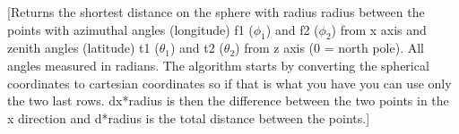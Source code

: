 [Returns the shortest distance on the sphere with radius radius between the points
 with azimuthal angles (longitude) f1 ($\phi_1$) and f2 ($\phi_2$) from x axis and zenith angles
 (latitude) t1 ($\theta_1$) and t2 ($\theta_2$) from z axis (0 = north pole). All angles measured
 in radians. The algorithm starts by converting the spherical coordinates to cartesian coordinates
 so if that is what you have you can use only the two last rows. dx*radius is then the difference
 between the two points in the x direction and d*radius is the total distance between the points.]